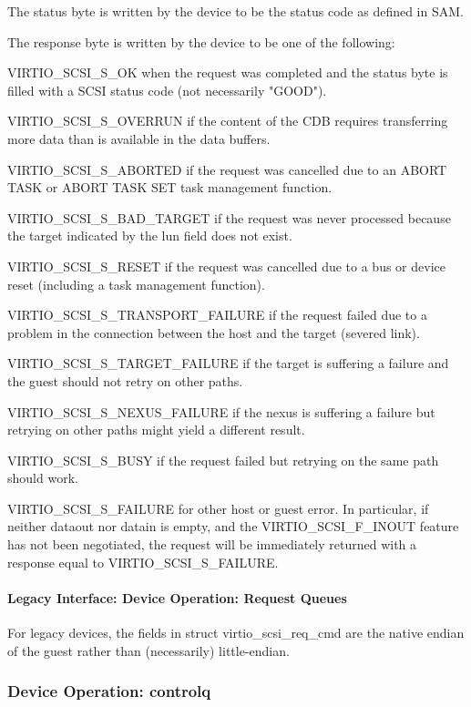 The status byte is written by the device to be the status code as
defined in SAM.

The response byte is written by the device to be one of the
following:

  VIRTIO_SCSI_S_OK when the request was completed and the status
  byte is filled with a SCSI status code (not necessarily
  "GOOD").

  VIRTIO_SCSI_S_OVERRUN if the content of the CDB requires
  transferring more data than is available in the data buffers.

  VIRTIO_SCSI_S_ABORTED if the request was cancelled due to an
  ABORT TASK or ABORT TASK SET task management function.

  VIRTIO_SCSI_S_BAD_TARGET if the request was never processed
  because the target indicated by the lun field does not exist.

  VIRTIO_SCSI_S_RESET if the request was cancelled due to a bus
  or device reset (including a task management function).

  VIRTIO_SCSI_S_TRANSPORT_FAILURE if the request failed due to a
  problem in the connection between the host and the target
  (severed link).

  VIRTIO_SCSI_S_TARGET_FAILURE if the target is suffering a
  failure and the guest should not retry on other paths.

  VIRTIO_SCSI_S_NEXUS_FAILURE if the nexus is suffering a failure
  but retrying on other paths might yield a different result.

  VIRTIO_SCSI_S_BUSY if the request failed but retrying on the
  same path should work.

  VIRTIO_SCSI_S_FAILURE for other host or guest error. In
  particular, if neither dataout nor datain is empty, and the
  VIRTIO_SCSI_F_INOUT feature has not been negotiated, the
  request will be immediately returned with a response equal to
  VIRTIO_SCSI_S_FAILURE.

\paragraph{Legacy Interface: Device Operation: Request Queues}\label{sec:Device Types / SCSI Host Device / Device Operation / Device Operation: Request Queues / Legacy Interface: Device Operation: Request Queues}
For legacy devices, the fields in struct virtio_scsi_req_cmd are the
native endian of the guest rather than (necessarily) little-endian.

\subsubsection{Device Operation: controlq}\label{sec:Device Types / SCSI Host Device / Device Operation / Device Operation: controlq}


